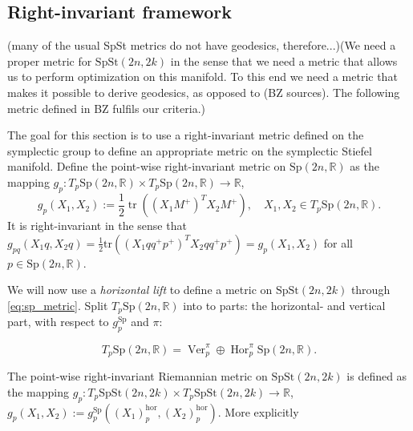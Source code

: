 \subsection{Right-invariant framework}

(many of the usual SpSt metrics do not have geodesics, therefore...)(We need a proper metric for $\mathrm{SpSt}(2n, 2k)$ in the sense that we need a metric that allows us to perform optimization on this manifold. To this end we need a metric that makes it possible to derive geodesics, as opposed to (BZ sources). The following metric defined in BZ fulfils our criteria.) 

The goal for this section is to use a right-invariant metric defined on the symplectic group to define an appropriate metric on the symplectic Stiefel manifold. Define the point-wise right-invariant metric on $\mathrm{Sp}(2n,\mathbb{R})$ as the mapping $g_{p}:T_{p}\mathrm{Sp}(2n,\mathbb{R})\times T_{p}\mathrm{Sp}(2n,\mathbb{R})\xrightarrow{}\mathbb{R}$, 
\begin{equation}\label{eq:sp_metric}
    g_{p}(X_{1},X_{2}):=\frac{1}{2}\operatorname{tr}((X_{1}M^{+})^{T}X_{2}M^{+}),\quad X_{1},X_{2}\in T_{p}\mathrm{Sp}(2n,\mathbb{R}).
\end{equation}
It is right-invariant in the sense that
$g_{pq}(X_{1}q,X_{2}q)=\tfrac{1}{2}\mathrm{tr}((X_{1}qq^{+}p^{+})^{T}X_{2}qq^{+}p^{+})=g_{p}(X_{1},X_{2})$ for all $p\in \mathrm{Sp}(2n,\mathbb{R})$.


We will now use a \textit{horizontal lift} to define a metric on $\mathrm{SpSt}(2n, 2k)$ through \ref{eq:sp_metric}. Split $T_{p}\mathrm{Sp}(2n,\mathbb{R})$ into to parts: the horizontal- and vertical part, with respect to $g^\mathrm{Sp}_{p}$ and $\pi$: %

\begin{equation}\label{eq:spst_split}
    T_{p}\mathrm{Sp}(2n,\mathbb{R})=\operatorname{Ver}^{\pi}_{p}\oplus \operatorname{Hor}^{\pi}_{p}\mathrm{Sp}(2n,\mathbb{R}).
\end{equation}

The point-wise right-invariant Riemannian metric on $\mathrm{SpSt}(2n, 2k)$ is defined as the mapping $g_{p}:T_{p}\mathrm{SpSt}(2n, 2k)\times T_{p}\mathrm{SpSt}(2n, 2k)\xrightarrow{}\mathbb{R}$, $g_{p}(X_{1},X_{2}):=g^{\mathrm{Sp}}_{p}((X_{1})^{\mathrm{hor}}_{p},(X_{2})^{\mathrm{hor}}_{p})$. More explicitly

